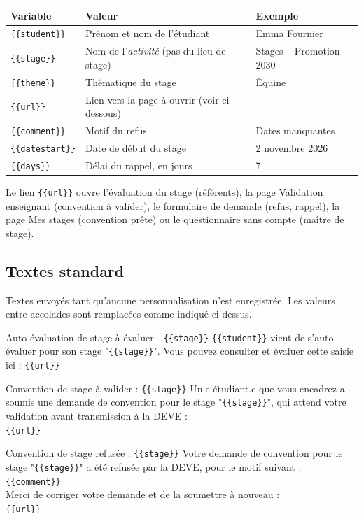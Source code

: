 \documentclass[11pt,a4paper]{article}
\newcommand{\var}[1]{\texttt{\{\{#1\}\}}}
\begin{document}
\begin{center}
\begin{tabularx}{\linewidth}{@{}l X l@{}}
\toprule
\textbf{Variable} & \textbf{Valeur} & \textbf{Exemple} \\
\midrule
\var{student} & Prénom et nom de l'étudiant & Emma Fournier \\
\var{stage} & Nom de l'\emph{activité} (pas du lieu de stage) & Stages -- Promotion 2030 \\
\var{theme} & Thématique du stage & Équine \\
\var{url} & Lien vers la page à ouvrir (voir ci-dessous) & \\
\var{comment} & Motif du refus & Dates manquantes \\
\var{datestart} & Date de début du stage & 2 novembre 2026 \\
\var{days} & Délai du rappel, en jours & 7 \\
\bottomrule
\end{tabularx}
\end{center}

Le lien \var{url} ouvre l'évaluation du stage (référents), la page
\og Validation enseignant\fg{} (convention à valider), le formulaire de demande
(refus, rappel), la page \og Mes stages\fg{} (convention prête) ou le
questionnaire sans compte (maître de stage).

\subsection{Textes standard}

Textes envoyés tant qu'aucune personnalisation n'est enregistrée. Les valeurs
entre accolades sont remplacées comme indiqué ci-dessus.

\begin{courriel}{Auto-évaluation de stage à évaluer - \var{stage}}
\var{student} vient de s'auto-évaluer pour son stage "\var{stage}". Vous pouvez
consulter et évaluer cette saisie ici : \var{url}
\end{courriel}

\begin{courriel}{Convention de stage à valider : \var{stage}}
Un.e étudiant.e que vous encadrez a soumis une demande de convention pour le stage
"\var{stage}", qui attend votre validation avant transmission à la DEVE :\\
\var{url}
\end{courriel}

\begin{courriel}{Convention de stage refusée : \var{stage}}
Votre demande de convention pour le stage "\var{stage}" a été refusée par la DEVE,
pour le motif suivant :\\[4pt]
\var{comment}\\[4pt]
Merci de corriger votre demande et de la soumettre à nouveau :\\
\var{url}
\end{courriel}
\end{document}
